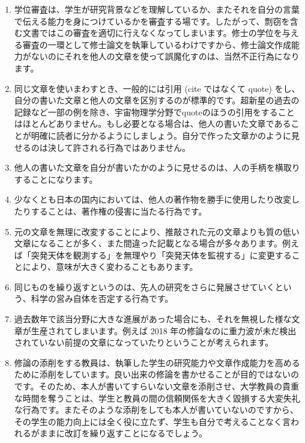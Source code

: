 \begin{enumerate}
\item 学位審査は、学生が研究背景などを理解しているか、またそれを自分の言葉で伝える能力を身につけているかを審査する場です。したがって、剽窃を含む文書ではこの審査を適切に行えなくなってしまいます。修士の学位を与える審査の一環として修士論文を執筆しているわけですから、修士論文作成能力がないのにそれを他人の文章を使って誤魔化すのは、当然不正行為になります。

\item 同じ文章を使いまわすとき、一般的には引用 (cite ではなくて quote) をし、自分の書いた文章と他人の文章を区別するのが標準的です。超新星の過去の記録など一部の例を除き、宇宙物理学分野でquoteのほうの引用をすることはほとんどありません。もし必要となる場合は、他人の書いた文章であることが明確に読者に分かるようにしましょう。自分で作った文章かのように見せるのは決して許される行為ではありません。

\item 他人の書いた文章を自分が書いたかのように見せるのは、人の手柄を横取りすることになります。

\item 少なくとも日本の国内においては、他人の著作物を勝手に使用したり改変したりすることは、著作権の侵害に当たる行為です。

\item 元の文章を無理に改変することにより、推敲された元の文章よりも質の低い文章になることが多く、また間違った記載となる場合が多々あります。例えば「突発天体を観測する」を無理やり「突発天体を監視する」に変更することにより、意味が大きく変わることもあります。

\item 同じものを繰り返すというのは、先人の研究をさらに発展させていくという、科学の営み自体を否定する行為です。

\item 過去数年で該当分野に大きな進展があった場合にも、それを無視した様な文章が生産されてしまいます。例えば 2018 年の修論なのに重力波が未だ検出されていない前提の文章になっていたりということが考えられます。

\item 修論の添削をする教員は、執筆した学生の研究能力や文章作成能力を高めるために添削をしています。良い出来の修論を書かせることが目的ではないのです。そのため、本人が書いてすらいない文章を添削させ、大学教員の貴重な時間を奪うことは、学生と教員の間の信頼関係を大きく毀損する大変失礼な行為です。またそのような添削をしても本人が書いていないのですから、その学生の能力向上には全く役に立たず、学生も自分で考えることなく言われるがままに改訂を繰り返すことになるでしょう。

\end{enumerate}
